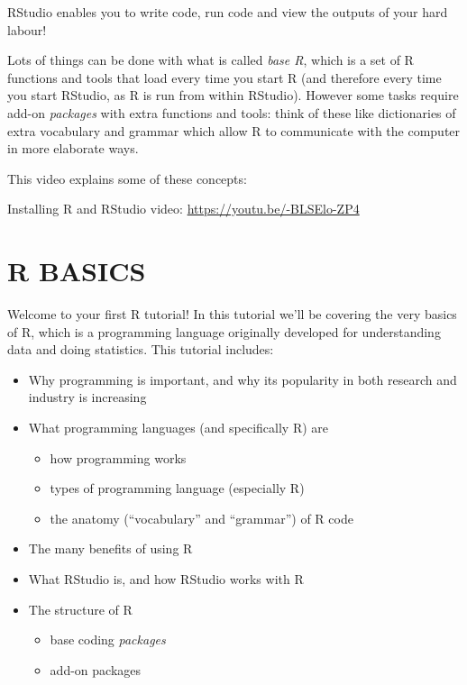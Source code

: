 \documentclass[
]{book}
\providecommand{\tightlist}{%
  \setlength{\itemsep}{0pt}\setlength{\parskip}{0pt}}
\begin{document}
RStudio enables you to write code, run code and view the outputs of
your hard labour!

Lots of things can be done with what is called \emph{base R},
which is a set of R functions and tools that load every time you start R
(and therefore every time you start RStudio, as R is run from within RStudio).
However some tasks require add-on \emph{packages} with
extra functions and tools: think of these like dictionaries of extra vocabulary and grammar
which allow R to communicate with the computer in more elaborate ways.

This video explains some of these concepts:

Installing R and RStudio video: \url{https://youtu.be/-BLSElo-ZP4}
~

\hypertarget{r-basics}{%
\chapter{R BASICS}\label{r-basics}}

Welcome to your first R tutorial! In this tutorial we'll be covering the very basics of R, which is a programming language originally developed for
understanding data and doing statistics. This tutorial includes:

\begin{itemize}
\tightlist
\item
  Why programming is important, and why its popularity in both research
  and industry is increasing
\item
  What programming languages (and specifically R) are

  \begin{itemize}
  \tightlist
  \item
    how programming works
  \item
    types of programming language (especially R)
  \item
    the anatomy (``vocabulary'' and ``grammar'') of R code
  \end{itemize}
\item
  The many benefits of using R
\item
  What RStudio is, and how RStudio works with R
\item
  The structure of R

  \begin{itemize}
  \tightlist
  \item
    base coding \emph{packages}
  \item
    add-on packages
  \end{itemize}
\end{itemize}
\end{document}
